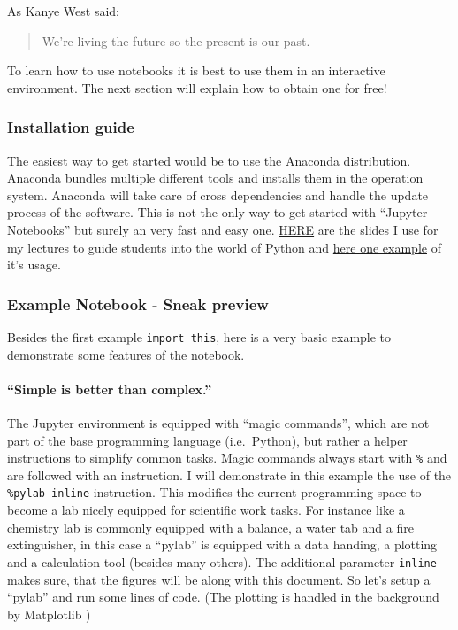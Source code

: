 \documentclass[11pt]{article}
\begin{document}
As Kanye West said:

\begin{quote}
We're living the future so the present is our past.
\end{quote}

To learn how to use notebooks it is best to use them in an interactive
environment. The next section will explain how to obtain one for free!

    \hypertarget{installation-guide}{%
\subsubsection{Installation guide}\label{installation-guide}}

The easiest way to get started would be to use the Anaconda
distribution. Anaconda bundles multiple different tools and installs
them in the operation system. Anaconda will take care of cross
dependencies and handle the update process of the software. This is not
the only way to get started with ``Jupyter Notebooks'' but surely an
very fast and easy one.
\href{media/presentations/InstallAnaconda/Anaconda-Python.pdf}{HERE} are
the slides I use for my lectures to guide students into the world of
Python and
\href{media/presentations/InstallAnaconda/PythonÜbung.zip}{here one
example} of it's usage.

    \hypertarget{example-notebook---sneak-preview}{%
\subsubsection{Example Notebook - Sneak
preview}\label{example-notebook---sneak-preview}}

Besides the first example \texttt{import\ this}, here is a very basic
example to demonstrate some features of the notebook.

    \hypertarget{simple-is-better-than-complex.}{%
\paragraph{``Simple is better than
complex.''}\label{simple-is-better-than-complex.}}

The Jupyter environment is equipped with ``magic commands'', which are
not part of the base programming language (i.e.~Python), but rather a
helper instructions to simplify common tasks. Magic commands always
start with \texttt{\%} and are followed with an instruction. I will
demonstrate in this example the use of the \texttt{\%pylab\ inline}
instruction. This modifies the current programming space to become a lab
nicely equipped for scientific work tasks. For instance like a chemistry
lab is commonly equipped with a balance, a water tab and a fire
extinguisher, in this case a ``pylab'' is equipped with a data handing,
a plotting and a calculation tool (besides many others). The additional
parameter \texttt{inline} makes sure, that the figures will be along
with this document. So let's setup a ``pylab'' and run some lines of
code. (The plotting is handled in the background by Matplotlib
\cite{Hunter2007})
\end{document}
